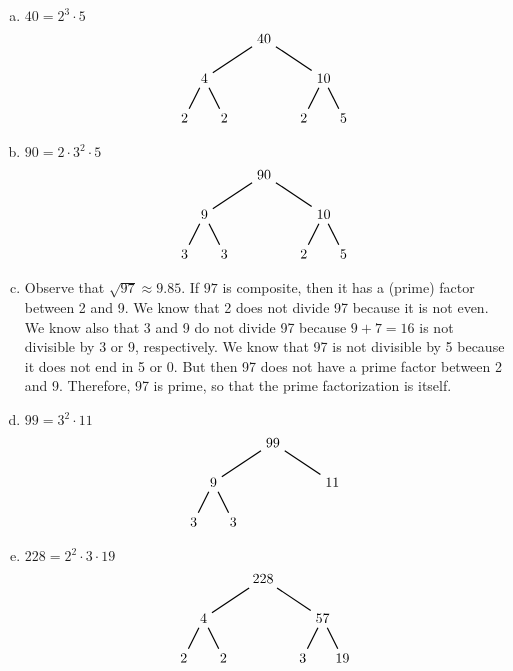 \documentclass[11pt,letterpaper]{article}
\begin{document}
\sol 
\begin{enumerate}[(a)]
\item $40= 2^3 \cdot 5$
	\[
	\begin{tikzpicture}
	\node at (0,0) (n) {40};
	\node at (-1.5,-1) (a) {4};
	\node at (1.5,-1) (b) {10};
	\node at (-2,-2) (c) {2};
	\node at (-1,-2) (d) {2};
	\node at (1,-2) (e) {2};
	\node at (2,-2) (f) {5};
	
	\draw[line width=0.03cm] (n) -- (a);
	\draw[line width=0.03cm] (n) -- (b);
	\draw[line width=0.03cm] (a) -- (c);
	\draw[line width=0.03cm] (a) -- (d);
	\draw[line width=0.03cm] (b) -- (e);
	\draw[line width=0.03cm] (b) -- (f);
	\end{tikzpicture}
	\]

\item $90= 2 \cdot 3^2 \cdot 5$
	\[
	\begin{tikzpicture}
	\node at (0,0) (n) {90};
	\node at (-1.5,-1) (a) {9};
	\node at (1.5,-1) (b) {10};
	\node at (-2,-2) (c) {3};
	\node at (-1,-2) (d) {3};
	\node at (1,-2) (e) {2};
	\node at (2,-2) (f) {5};
	
	\draw[line width=0.03cm] (n) -- (a);
	\draw[line width=0.03cm] (n) -- (b);
	\draw[line width=0.03cm] (a) -- (c);
	\draw[line width=0.03cm] (a) -- (d);
	\draw[line width=0.03cm] (b) -- (e);
	\draw[line width=0.03cm] (b) -- (f);
	\end{tikzpicture}
	\]

\item Observe that $\sqrt{97} \approx 9.85$. If $97$ is composite, then it has a (prime) factor between 2 and 9. We know that 2 does not divide 97 because it is not even. We know also that 3 and 9 do not divide 97 because $9 + 7= 16$ is not divisible by 3 or 9, respectively. We know that 97 is not divisible by 5 because it does not end in 5 or 0. But then 97 does not have a prime factor between 2 and 9. Therefore, 97 is prime, so that the prime factorization is itself. 

\item $99= 3^2 \cdot 11$
	\[
	\begin{tikzpicture}
	\node at (0,0) (n) {99};
	\node at (-1.5,-1) (a) {9};
	\node at (1.5,-1) (b) {11};
	\node at (-2,-2) (c) {3};
	\node at (-1,-2) (d) {3};
	
	\draw[line width=0.03cm] (n) -- (a);
	\draw[line width=0.03cm] (n) -- (b);
	\draw[line width=0.03cm] (a) -- (c);
	\draw[line width=0.03cm] (a) -- (d);
	\end{tikzpicture}
	\]

\item $228= 2^2 \cdot 3 \cdot 19$
	\[
	\begin{tikzpicture}
	\node at (0,0) (n) {228};
	\node at (-1.5,-1) (a) {4};
	\node at (1.5,-1) (b) {57};
	\node at (-2,-2) (c) {2};
	\node at (-1,-2) (d) {2};
	\node at (1,-2) (e) {3};
	\node at (2,-2) (f) {19};
	
	\draw[line width=0.03cm] (n) -- (a);
	\draw[line width=0.03cm] (n) -- (b);
	\draw[line width=0.03cm] (a) -- (c);
	\draw[line width=0.03cm] (a) -- (d);
	\draw[line width=0.03cm] (b) -- (e);
	\draw[line width=0.03cm] (b) -- (f);
	\end{tikzpicture}
	\]
\end{enumerate}
\end{document}
